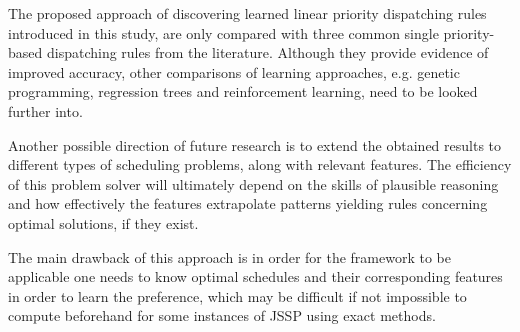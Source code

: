 \documentclass[10pt]{llncs}
\begin{document}
The proposed approach of discovering learned linear priority dispatching rules introduced in this study, are only compared with three common single priority-based dispatching rules from the literature. Although they provide evidence of improved accuracy, other comparisons of learning approaches, e.g. genetic programming, regression trees and reinforcement learning, need to be looked further into. %

Another possible direction of future research is to extend the obtained results to different types of scheduling problems, along with relevant features. The efficiency of this problem solver will ultimately depend on the skills of plausible reasoning and how effectively the features extrapolate patterns yielding rules concerning optimal solutions, if they exist.

The main drawback of this approach is in order for the framework to be applicable one needs to know optimal schedules and their corresponding features in order to learn the preference, which may be difficult if not impossible to compute beforehand for some instances of JSSP using exact methods.



\end{document}
